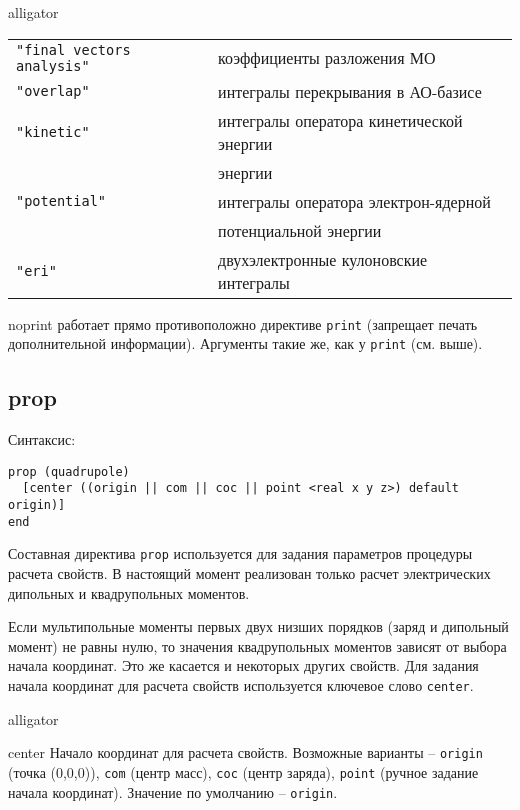 \documentclass[a4paper, 12pt]{article}
\begin{document}
\begin{labeling}{alligator}
{
\small
\begin{tabular}{|l|l|}
\hline
\texttt{"final vectors analysis"} & коэффициенты разложения МО \\
\texttt{"overlap"}   & интегралы перекрывания в АО-базисе \\
\texttt{"kinetic"}   & интегралы оператора кинетической энергии \\
                     & энергии \\
\texttt{"potential"} & интегралы оператора электрон-ядерной \\
                     & потенциальной энергии \\
\texttt{"eri"}       & двухэлектронные кулоновские интегралы \\
\hline
\end{tabular}
}
\item [noprint] работает прямо противоположно директиве \texttt{print} (запрещает печать дополнительной информации). Аргументы такие же, как у \texttt{print} (см. выше).
\end{labeling}

\subsection{prop}

Синтаксис:

\begin{lstlisting}
prop (quadrupole)
  [center ((origin || com || coc || point <real x y z>) default origin)]
end
\end{lstlisting}

Составная директива \texttt{prop} используется для задания параметров процедуры расчета свойств. В настоящий момент реализован только расчет электрических дипольных и квадрупольных моментов. 

Если мультипольные моменты первых двух низших порядков (заряд и дипольный момент) не равны нулю, то значения квадрупольных моментов зависят от выбора начала координат. Это же касается и некоторых других свойств. Для задания начала координат для расчета свойств используется ключевое слово \texttt{center}.

\begin{labeling}{alligator}
\item [center] Начало координат для расчета свойств. Возможные варианты -- 
\texttt{origin} (точка (0,0,0)), \texttt{com} (центр масс), \texttt{coc} (центр заряда), \texttt{point} (ручное задание начала координат). Значение по умолчанию -- \texttt{origin}.
\end{labeling}
\end{document}
